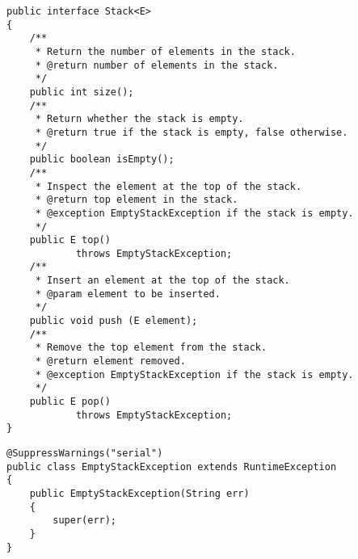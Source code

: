 \begin{lstlisting}
public interface Stack<E>
{
	/**
	 * Return the number of elements in the stack.
	 * @return number of elements in the stack. 
	 */
	public int size();
	/** 
	 * Return whether the stack is empty.
	 * @return true if the stack is empty, false otherwise. 
	 */
	public boolean isEmpty();
	/** 
	 * Inspect the element at the top of the stack.
	 * @return top element in the stack.  
	 * @exception EmptyStackException if the stack is empty. 
	 */
	public E top() 
			throws EmptyStackException;  
	/**
	 * Insert an element at the top of the stack.
	 * @param element to be inserted.
	 */
	public void push (E element); 
	/** 
	 * Remove the top element from the stack.
	 * @return element removed.
	 * @exception EmptyStackException if the stack is empty.
	 */
	public E pop()
			throws EmptyStackException;
}
\end{lstlisting}

\begin{lstlisting}
@SuppressWarnings("serial")
public class EmptyStackException extends RuntimeException
{  
	public EmptyStackException(String err)
	{
		super(err);
	}
}
\end{lstlisting}

